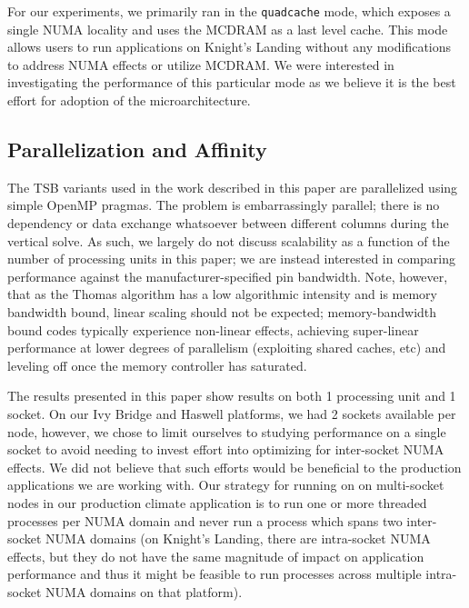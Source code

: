 \documentclass{sig-alternate-05-2015}
\begin{document}
For our experiments, we primarily ran in the \lstinline{quadcache} mode, which
exposes a single NUMA locality and uses the MCDRAM as a last level cache. This
mode allows users to run applications on Knight's Landing without any
modifications to address NUMA effects or utilize MCDRAM. We were interested in
investigating the performance of this particular mode as we believe it is the
best effort for adoption of the microarchitecture.


\subsection{Parallelization and Affinity}
\label{sec:experimental_setup:parallelization_and_affinity}

The TSB variants used in the work described in this paper are parallelized
using simple OpenMP pragmas. The problem is embarrassingly parallel; there is
no dependency or data exchange whatsoever between different columns during the
vertical solve. As such, we largely do not discuss scalability as a function of
the number of processing units in this paper; we are instead interested in
comparing performance against the manufacturer-specified pin bandwidth. Note,
however, that as the Thomas algorithm has a low algorithmic intensity and is
memory bandwidth bound, linear scaling should not be expected; memory-bandwidth
bound codes typically experience non-linear effects, achieving super-linear
performance at lower degrees of parallelism (exploiting shared caches, etc) and
leveling off once the memory controller has saturated.

The results presented in this paper show results on both 1 processing unit and
1 socket. On our Ivy Bridge and Haswell platforms, we had 2 sockets available
per node, however, we chose to limit ourselves to studying performance on a
single socket to avoid needing to invest effort into optimizing for
inter-socket NUMA effects. We did not believe that such efforts would be
beneficial to the production applications we are working with. Our strategy for
running on on multi-socket nodes in our production climate application is to
run one or more threaded processes per NUMA domain and never run a process
which spans two inter-socket NUMA domains (on Knight's Landing, there are
intra-socket NUMA effects, but they do not have the same magnitude of impact on
application performance and thus it might be feasible to run processes across
multiple intra-socket NUMA domains on that platform). 
\end{document}
